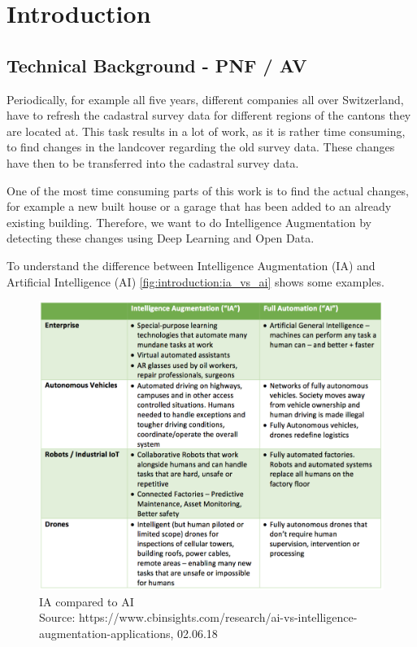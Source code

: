 
\chapter{Introduction}
\section{Technical Background - PNF / AV}
Periodically, for example all five years, different companies all over Switzerland, have to refresh the cadastral survey data for different regions of the cantons they are located at. This task results in a lot of work, as it is rather time consuming, to find changes in the landcover regarding the old survey data. These changes have then to be transferred into the cadastral survey data.

One of the most time consuming parts of this work is to find the actual changes, for example a new built house or a garage that has been added to an already existing building. Therefore, we want to do Intelligence Augmentation \cite{Engelbart.1962} by detecting these changes using Deep Learning and Open Data.

To understand the difference between Intelligence Augmentation (IA) and Artificial Intelligence (AI) \autoref{fig:introduction:ia_vs_ai} shows some examples.

\begin{figure}[H]
    \centering
	\includegraphics[width=0.9\linewidth]{chapters/introduction/images/ia_vs_ai.png}
	\caption{IA compared to AI\\Source: https://www.cbinsights.com/research/ai-vs-intelligence-augmentation-applications, 02.06.18}
	\label{fig:introduction:ia_vs_ai}
\end{figure}


